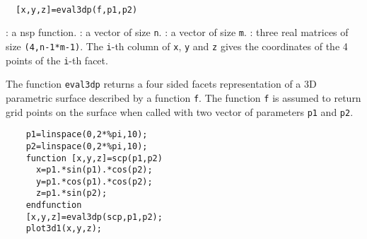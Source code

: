 \begin{mandesc}
  \\
\end{mandesc}
\begin{calling_sequence}
\begin{verbatim}
  [x,y,z]=eval3dp(f,p1,p2)
\end{verbatim}
\end{calling_sequence}
\begin{parameters}
  \begin{varlist}
    :  a nsp function.
    : a vector of size \verb!n!.
    : a vector of size \verb!m!.
    : three real matrices of size \verb!(4,n-1*m-1)!. The \verb!i!-th column
    of \verb!x!, \verb!y! and \verb!z! gives the coordinates of the 4 points of the
    \verb!i!-th facet.
  \end{varlist}
\end{parameters}

\begin{mandescription}
  The function \verb!eval3dp! returns a four sided facets representation of a
  3D parametric surface described by a function \verb!f!. The function \verb!f!
  is assumed to return grid points on the surface when called with two vector of
  parameters \verb!p1! and \verb!p2!.
\end{mandescription}

\begin{examples}
  \begin{Verbatim}
    p1=linspace(0,2*%pi,10);
    p2=linspace(0,2*%pi,10);
    function [x,y,z]=scp(p1,p2)
      x=p1.*sin(p1).*cos(p2);
      y=p1.*cos(p1).*cos(p2);
      z=p1.*sin(p2);
    endfunction
    [x,y,z]=eval3dp(scp,p1,p2);
    plot3d1(x,y,z);
  \end{Verbatim}
\end{examples}

\begin{manseealso}
   
\end{manseealso}
